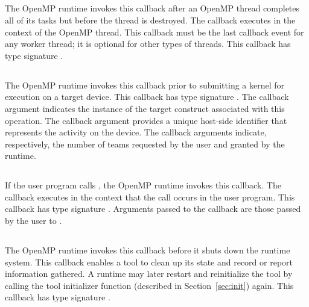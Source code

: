 \subsection{}
The OpenMP runtime invokes this callback
after an OpenMP thread completes all of
its tasks but before the thread is destroyed. The callback
executes in the context of the OpenMP thread. This callback must be the last callback event for any worker thread; it is optional for other types of threads.
This callback has type signature .

\subsection{}

The OpenMP runtime invokes this callback prior to submitting a kernel for execution on a target device.
This callback has type signature .
The callback argument  indicates the instance of the target construct associated with this operation.
The callback argument  provides a unique host-side identifier that represents the activity on the device.
The callback arguments    indicate, respectively, the number of teams requested by the user and granted by the runtime.

\subsection{}
If the user program calls , the
OpenMP runtime invokes this callback.
The callback executes in the context that the call occurs in the user program.
This callback has type signature .
Arguments passed to the callback are those passed by the user to .

\subsection{}
The OpenMP runtime invokes this callback before it shuts down the
 runtime system.  This callback enables a tool to clean up its
 state and record or report information gathered. A runtime may later restart and reinitialize the tool by
calling the tool initializer
function (described in Section~\ref{sec:init}) again.
 This callback has type signature .

